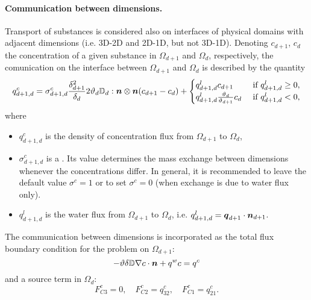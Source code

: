 \paragraph{Communication between dimensions.}
Transport of substances is considered also on interfaces of physical domains with adjacent dimensions (i.e. 3D-2D and 2D-1D, but not 3D-1D).
Denoting $c_{d+1}$, $c_d$ the concentration of a given substance in $\Omega_{d+1}$ and $\Omega_d$, respectively, the comunication on the interface between $\Omega_{d+1}$ and $\Omega_d$ is described by the quantity
\begin{equation}
  \label{e:inter_dim_flux}
  q^c_{d+1,d} = \sigma^c_{d+1,d} \frac{\delta_{d+1}^2}{\delta_d}2\th_d\D_d:\n\otimes\n ( c_{d+1} - c_d) + \begin{cases}q^l_{d+1,d} c_{d+1} & \mbox{ if }q^l_{d+1,d}\ge 0,\\q^l_{d+1,d} \frac{\th_d}{\th_{d+1}} c_d & \mbox{ if }q^l_{d+1,d}<0,\end{cases}
\end{equation}
where
\begin{itemize}
\item $q^c_{d+1,d}$  is the density of concentration flux from $\Omega_{d+1}$ to $\Omega_d$,
\item $\sigma^c_{d+1,d}$ \units{}{}{} is a .
Its value determines the mass exchange between dimensions whenever the concentrations differ.
In general, it is recommended to leave the default value $\sigma^c=1$ or to set $\sigma^c=0$ (when exchange is due to water flux only).
\item $q^l_{d+1,d}$  is the water flux from $\Omega_{d+1}$ to $\Omega_d$, i.e. $q^l_{d+1,d} = \mathbf{\boldsymbol{q}}_{d+1}\cdot\mathbf{\boldsymbol{n}}_{d+1}$.
\end{itemize}
The communication between dimensions is incorporated as the total flux boundary condition for the problem on $\Omega_{d+1}$:
\begin{equation}
\label{e:FC}
-\th\delta\D\nabla c\cdot\vc n + q^w c = q^c
\end{equation}
and a source term in $\Omega_d$:
\begin{equation}
F^c_{C3} = 0,\quad
F^c_{C2} = q^c_{32},\quad
F^c_{C1} = q^c_{21}.
\end{equation}



